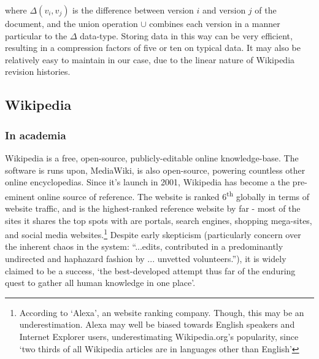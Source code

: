 \documentclass[a4paper,11pt,twoside,notitlepage]{article}
\newcommand{\super}[1]{\textsuperscript{#1}}
\begin{document}
        where ${\Delta}(v_i,v_j)$ is the difference between version
        $i$ and version $j$ of the document, and the union operation
        $\cup$ combines each version in a manner particular to the
        $\Delta$ data-type. Storing data in this way can be very
        efficient, resulting in a compression factors of five or ten
        on typical data.\cite{Macdonald2000} It may also be relatively
        easy to maintain in our case, due to the linear nature of
        Wikipedia revision histories.

        \subsection{Wikipedia}
        \subsubsection*{In academia}
        Wikipedia is a free, open-source, publicly-editable online
        knowledge-base. The software is runs upon, MediaWiki, is also
        open-source, powering countless other online
        encyclopedias. Since it's launch in 2001, Wikipedia has become
        a the pre-eminent online source of reference. The website is
        ranked 6\super{th} globally in terms of website traffic, and
        is the highest-ranked reference website by far - most of the
        sites it shares the top spots with are portals, search
        engines, shopping mega-sites, and social media
        websites.\footnote{According to `Alexa', an website ranking
          company.\cite{Alexa-about2014} Though, this may be an
          underestimation. Alexa may well be biased towards English
          speakers and Internet Explorer users, underestimating
          Wikipedia.org's popularity, since `two thirds of all
          Wikipedia articles are in languages other than
          English'\cite{wikimedia-noteonalexa}} Despite early
        skepticism (particularly concern over the inherent chaos in
        the system: ``...edits, contributed in a predominantly
        undirected and haphazard fashion by ... unvetted
        volunteers.''\cite{Wilkinson2007}), it is widely claimed to be
        a success, `the best-developed attempt thus far of the
        enduring quest to gather all human knowledge in one
        place'\cite{Mesgari2014}.
\end{document}
